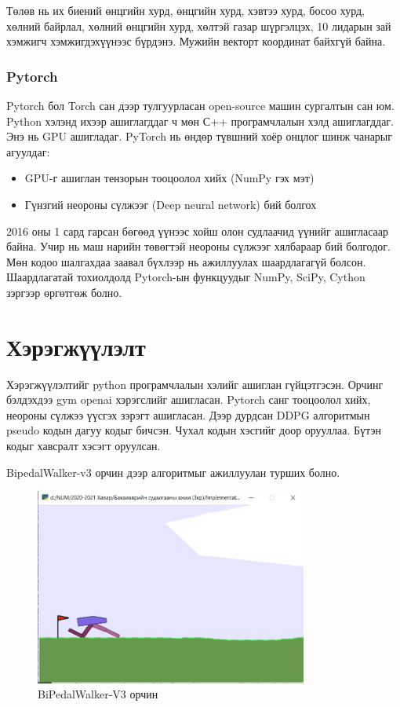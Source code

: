 \documentclass[12pt,A4]{report}
\begin{document}
Төлөв нь их биений өнцгийн хурд, өнцгийн хурд, хэвтээ хурд, босоо хурд, хөлний байрлал, хөлний өнцгийн хурд, хөлтэй газар шүргэлцэх, 10 лидарын зай хэмжигч хэмжигдэхүүнээс бүрдэнэ. Мужийн векторт координат байхгүй байна.

\subsection{Pytorch}

Pytorch бол Torch сан дээр тулгуурласан open-source машин сургалтын сан юм. Python хэлэнд ихээр ашиглагддаг ч мөн С++ програмчлалын хэлд ашиглагддаг. Энэ нь GPU ашигладаг. PyTorch нь өндөр түвшний хоёр онцлог шинж чанарыг агуулдаг:

\begin{itemize}
	\item GPU-г ашиглан тензорын тооцоолол хийх (NumPy гэх мэт) 
	\item Гүнзгий неороны сүлжээг (Deep neural network) бий болгох
\end{itemize}

2016 оны 1 сард гарсан бөгөөд үүнээс хойш олон судлаачид үүнийг ашигласаар байна. Учир нь маш нарийн төвөгтэй неороны сүлжээг хялбараар бий болгодог. Мөн кодоо шалгахдаа заавал бүхлээр нь ажиллуулах шаардлагагүй болсон. Шаардлагатай тохиолдолд Pytorch-ын функцуудыг NumPy, SciPy, Cython зэргээр өргөтгөж болно. 
 
\chapter{Хэрэгжүүлэлт}

Хэрэгжүүлэлтийг python програмчлалын хэлийг ашиглан гүйцэтгэсэн. Орчинг бэлдэхдээ gym openai хэрэгслийг ашигласан. Pytorch санг тооцоолол хийх, неороны сүлжээ үүсгэх зэрэгт ашигласан. Дээр дурдсан DDPG алгоритмын pseudo кодын дагуу кодыг бичсэн. Чухал кодын хэсгийг доор орууллаа. Бүтэн кодыг хавсралт хэсэгт оруулсан.

BipedalWalker-v3 орчин дээр алгоритмыг ажиллуулан турших болно.

\begin{figure}[H]
\centering
\includegraphics[width=0.8\textwidth]{./images/bipedalwalker}
\caption{BiPedalWalker-V3 орчин}
\end{figure}
\end{document}
